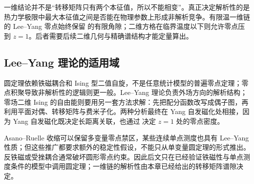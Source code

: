 一维结论并不是“转移矩阵只有两个本征值，所以不能相变”。真正决定解析性的是热力学极限中最大本征值之间是否能在物理参数上形成非解析竞争。有限温一维链的 Lee--Yang 零点始终保留 的有限角隙；二维方格在临界温度以下则允许零点压到 \(z=1\)。后者需要后续二维几何与精确谱结构才能定量算出。


\subsection{Lee--Yang 理论的适用域}

圆定理依赖铁磁耦合和 Ising 型二值自旋，不是任意统计模型的普遍零点定理；零点积聚导致非解析性的逻辑则更一般。Lee--Yang 理论负责外场方向的解析结构；零场二维 Ising 的自由能则要用另一套方法求解：先把配分函数改写成偶子图，再利用平面对偶、转移矩阵与费米子化。两种分析最终在 Yang 自发磁化处相接，因为 Yang 自发磁化既决定长距离关联，也通过 决定 \(z=1\) 处的零点密度。

Asano--Ruelle 收缩可以保留多变量零点禁区，某些连续单点测度也具有 Lee--Yang 性质；但这些推广都要求额外的稳定性假设，不能只从单变量圆定理的形式推出。反铁磁或受挫耦合通常破坏圆形零点约束。因此后文只在已经验证铁磁性与单点测度条件的模型中调用圆定理；一维链的解析性由本章已经给出的转移矩阵谱隙决定。
